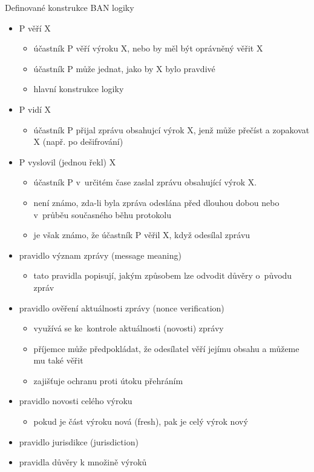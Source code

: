 Definované konstrukce BAN logiky
\begin{itemize}
    \item P věří X
    \begin{itemize}
        \item účastník P věří výroku X, nebo by měl být oprávněný věřit X
        \item účastník P může jednat, jako by X bylo pravdivé
        \item hlavní konstrukce logiky
    \end{itemize}
    \item P vidí X
    \begin{itemize}
        \item účastník P přijal zprávu obsahujcí výrok X, jenž může přečíst a zopakovat X (např. po dešifrování)
    \end{itemize}
    \item P vyslovil (jednou řekl) X
    \begin{itemize}
        \item účastník P v~určitém čase zaslal zprávu obsahující výrok X. 
        \item není známo, zda-li byla zpráva odeslána před dlouhou dobou nebo v~průběu současného běhu protokolu
        \item je však známo, že účastník P věřil X, když odesílal zprávu \\
    \end{itemize}
    \item pravidlo význam zprávy (message meaning)
    \begin{itemize}
        \item tato pravidla popisují, jakým způsobem lze odvodit důvěry o~původu zpráv
    \end{itemize}
    \item pravidlo ověření aktuálnosti zprávy (nonce verification)
    \begin{itemize}
        \item využívá se ke~kontrole aktuálnosti (novosti) zprávy
        \item příjemce může předpokládat, že odesílatel věří jejímu obsahu a můžeme mu také věřit
        \item zajišťuje ochranu proti útoku přehráním
    \end{itemize}
    \item pravidlo novosti celého výroku
    \begin{itemize}
        \item pokud je část výroku nová (fresh), pak je celý výrok nový
    \end{itemize}
    \item pravidlo jurisdikce (jurisdiction)
    \item pravidla důvěry k množině výroků
\end{itemize}
